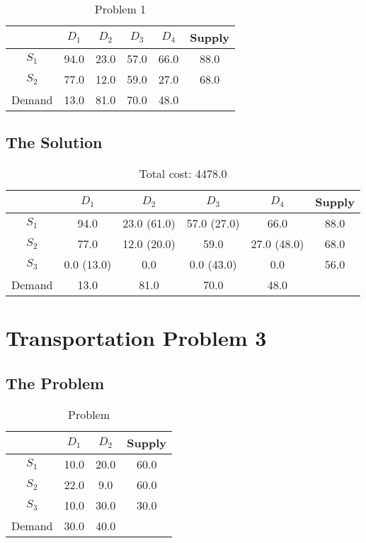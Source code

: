 \documentclass{article}
\begin{document}
\begin{table}[H]
\begin{tabular}{|c|c|c|c|c|c|}
\hline
     & $D_1$ & $D_2$ & $D_3$ & $D_4$ & Supply \\
\hline
$S_1$ & 94.0 & 23.0 & 57.0 & 66.0 & 88.0\\
$S_2$ & 77.0 & 12.0 & 59.0 & 27.0 & 68.0\\
\hline
Demand & 13.0 & 81.0 & 70.0 & 48.0 & \\
\hline
\end{tabular}
\label{tbl:}
\caption{Problem 1}
\end{table}

\subsection{The Solution}

\begin{table}[H]
\begin{tabular}{|c|c|c|c|c|c|}
\hline
     & $D_1$ & $D_2$ & $D_3$ & $D_4$ & Supply \\
\hline
$S_1$ & 94.0 & 23.0 \tiny{(61.0)} & 57.0 \tiny{(27.0)} & 66.0 & 88.0\\
$S_2$ & 77.0 & 12.0 \tiny{(20.0)} & 59.0 & 27.0 \tiny{(48.0)} & 68.0\\
$S_3$ & 0.0 \tiny{(13.0)} & 0.0 & 0.0 \tiny{(43.0)} & 0.0 & 56.0\\
\hline
Demand & 13.0 & 81.0 & 70.0 & 48.0 & \\
\hline
\end{tabular}
\label{tbl:}
\caption{Total cost: 4478.0}
\end{table}


\section{Transportation Problem 3}
\subsection{The Problem}
\begin{table}[H]
\begin{tabular}{|c|c|c|c|}
\hline
     & $D_1$ & $D_2$ & Supply \\
\hline
$S_1$ & 10.0 & 20.0 & 60.0\\
$S_2$ & 22.0 & 9.0 & 60.0\\
$S_3$ & 10.0 & 30.0 & 30.0\\
\hline
Demand & 30.0 & 40.0 & \\
\hline
\end{tabular}
\label{tbl:}
\caption{Problem}
\end{table}
\end{document}
